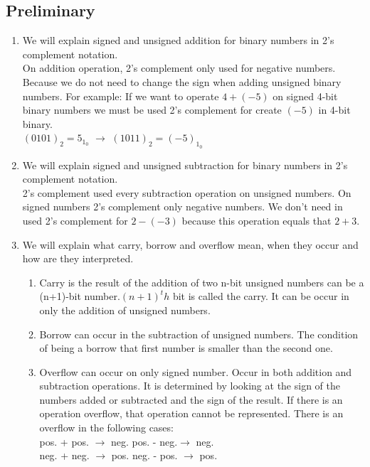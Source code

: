 \documentclass[pdftex,12pt,a4paper]{article}
\begin{document}
\subsection{Preliminary} 
\begin{enumerate}
\item We will explain signed and unsigned addition for binary numbers in 2's complement notation.\\ 
On addition operation, 2's complement only used for negative numbers. Because we do not need to change the sign when adding unsigned binary numbers. For example: If we want to operate $4 + (-5)$ on signed 4-bit binary numbers we must be used 2's complement for create $(-5)$ in 4-bit binary.\\
$(0101)_2 = 5_1_0$  $\longrightarrow$ $(1011)_2 = (-5)_1_0$

\item We will explain signed and unsigned subtraction for binary numbers in 2’s complement notation.\\
2's complement used every subtraction operation on unsigned numbers. On signed numbers 2's complement only negative numbers. We don't need in used 2's complement for $2 - (-3)$  because this operation equals that $2 + 3$.

\item We will explain what carry, borrow and overflow mean, when they occur and how are they interpreted.
\begin{enumerate}
\item Carry is the result of the addition of two n-bit unsigned numbers can be a (n+1)-bit number.$(n+1)^th$ bit is called the carry. It can be occur in only  the addition of unsigned numbers.
\item Borrow can occur in the subtraction of unsigned numbers. The condition of being a borrow that first number is smaller than the second one.
\item Overflow can occur on only signed number. Occur in both addition and subtraction operations. It is determined by looking at the sign of the numbers added or subtracted and the sign of the result. If there is an operation overflow, that operation cannot be represented. There is an overflow in the following cases:\\
pos. + pos. $\longrightarrow$ neg. \hspace{1cm}  pos. - neg.$\longrightarrow$ neg.\\ neg. + neg. $\longrightarrow$ pos. \hspace{1cm} neg. - pos. $\longrightarrow$ pos.

\end{enumerate}

\end{enumerate}
\end{document}
